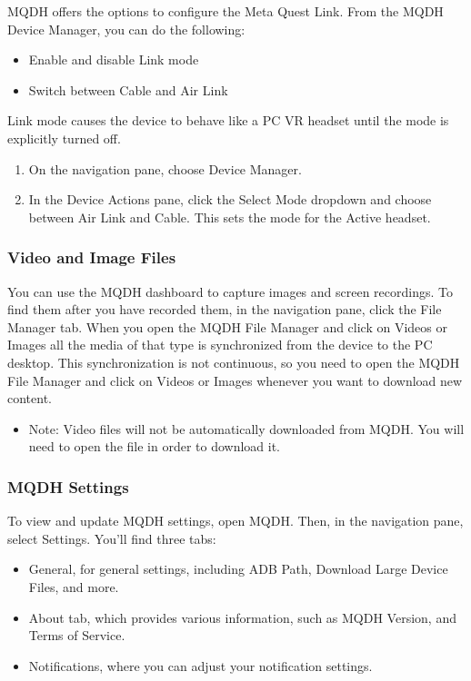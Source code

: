 \documentclass{article}
\begin{document}
MQDH offers the options to configure the Meta Quest Link. From the MQDH Device Manager, you can do the following:

\begin{itemize}
    \item Enable and disable Link mode
    \item Switch between Cable and Air Link
\end{itemize}

Link mode causes the device to behave like a PC VR headset until the mode is explicitly turned off.

\begin{enumerate}
    \item On the navigation pane, choose Device Manager.
    \item In the Device Actions pane, click the Select Mode dropdown and choose between Air Link and Cable. This sets the mode for the Active headset.
\end{enumerate}

\subsubsection{Video and Image Files}

You can use the MQDH dashboard to capture images and screen recordings. To find them after you have recorded them, in the navigation pane, click the File Manager tab. When you open the MQDH File Manager and click on Videos or Images all the media of that type is synchronized from the device to the PC desktop. This synchronization is not continuous, so you need to open the MQDH File Manager and click on Videos or Images whenever you want to download new content.

\begin{itemize}
    \item Note: Video files will not be automatically downloaded from MQDH. You will need to open the file in order to download it.
\end{itemize}

\subsubsection{MQDH Settings}

To view and update MQDH settings, open MQDH. Then, in the navigation pane, select Settings. You’ll find three tabs:

\begin{itemize}
    \item General, for general settings, including ADB Path, Download Large Device Files, and more.
    \item About tab, which provides various information, such as MQDH Version, and Terms of Service.
    \item Notifications, where you can adjust your notification settings.
\end{itemize}
\end{document}
